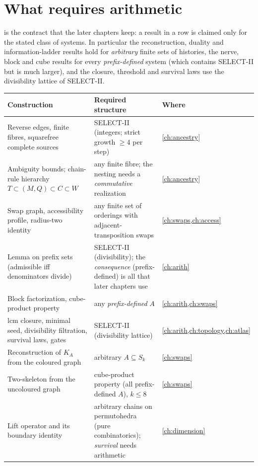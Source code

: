 \section{What requires arithmetic}\label{sec:needs}
 is the contract that the later chapters keep: a result in a row is claimed only for the stated class of systems. In particular the reconstruction, duality and information-ladder results hold for \emph{arbitrary} finite sets of histories, the nerve, block and cube results for every \emph{prefix-defined} system (which contains SELECT-II but is much larger), and the closure, threshold and survival laws use the divisibility lattice of SELECT-II.
\begin{table}[ht]\centering\small
\begin{tabularx}{\textwidth}{@{}>{\raggedright\arraybackslash}p{4.2cm}>{\raggedright\arraybackslash}X>{\raggedright\arraybackslash}p{2.2cm}@{}}
\toprule
Construction & Required structure & Where\\\midrule
Reverse edges, finite fibres, squarefree complete sources & SELECT-II (integers; strict growth $\ge4$ per step) & \cref{ch:ancestry}\\
Ambiguity bounds; chain-rule hierarchy $T\!\subset\!(M,Q)\!\subset\!C\!\subset\!W$ & any finite fibre; the nesting needs a \emph{commutative} realization & \cref{ch:ancestry}\\
Swap graph, accessibility profile, radius-two identity & any finite set of orderings with adjacent-transposition swaps & \cref{ch:swaps,ch:access}\\
Lemma on prefix sets (admissible iff denominators divide) & SELECT-II (divisibility); the \emph{consequence} (prefix-defined) is all that later chapters use & \cref{ch:arith}\\
Block factorization, cube-product property & any \emph{prefix-defined} $A$ & \cref{ch:arith,ch:swaps}\\
lcm closure, minimal seed, divisibility filtration, survival laws, gates & SELECT-II (divisibility lattice) & \cref{ch:arith,ch:topology,ch:atlas}\\
Reconstruction of $K_A$ from the coloured graph & arbitrary $A\subseteq S_k$ & \cref{ch:swaps}\\
Two-skeleton from the uncoloured graph & cube-product property (all prefix-defined $A$), $k\le8$ & \cref{ch:swaps}\\
Lift operator and its boundary identity & arbitrary chains on permutohedra (pure combinatorics); \emph{survival} needs arithmetic & \cref{ch:dimension}\\

\end{tabularx}
\end{table}
